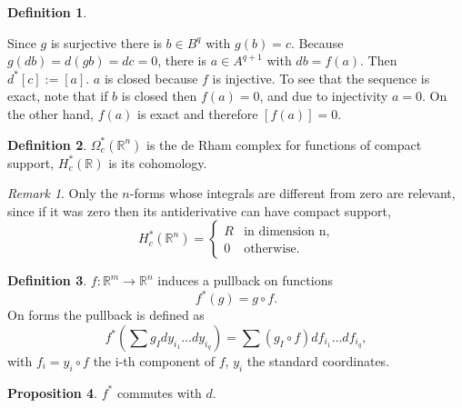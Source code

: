 \documentclass[twocolumn]{article}
\theoremstyle{definition}
\newtheorem{definition}{Definition}[section]
\newtheorem{proposition}[definition]{Proposition}
\theoremstyle{remark}
\newtheorem*{remark}{Remark}
\begin{document}
\begin{definition}
\begin{center}
    \end{center}
    Since $g$ is surjective there is $b\in B^q$ with $g(b)=c$. Because $g(db)=d(gb)=dc=0$, there is $a\in A^{q+1}$ with $db=f(a)$.
    Then $d^*[c] := [a]$. $a$ is closed because $f$ is injective. To see that the sequence is exact, note that if $b$ is closed then $f(a) = 0$, and due to injectivity $a = 0$.
    On the other hand, $f(a)$ is exact and therefore $[f(a)] = 0$.
\end{definition}
\begin{definition}
    $\Omega_c^*(\mathbb{R}^n)$ is the de Rham complex for functions of compact support,
    $H_c^*(\mathbb{R})$ is its cohomology.
\end{definition}
\begin{remark}
    Only the $n$-forms whose integrals are different from zero are relevant,
    since if it was zero then its antiderivative can have compact support,
    \begin{equation}
        H_c^*(\mathbb{R}^n) =
        \begin{cases}
            R & \textrm{in dimension n,}\\
            0 & \textrm{otherwise.}
        \end{cases}
    \end{equation}
\end{remark}
\begin{definition}
    $f: \mathbb{R}^m \rightarrow \mathbb{R}^n$ induces a pullback on functions
    \begin{equation}
        f^*(g) = g \circ f.
    \end{equation}
    On forms the pullback is defined as
    \begin{equation}
        f^*(\sum g_I dy_{i_1} \dots dy_{i_q}) = \sum(g_I \circ f) df_{i_1} \dots df_{i_q},
    \end{equation}
    with $f_i = y_i \circ f$ the i-th component of $f$, $y_i$ the standard coordinates.
\end{definition}
\begin{proposition}
    $f^*$ commutes with $d$.
\end{proposition}
\end{document}
